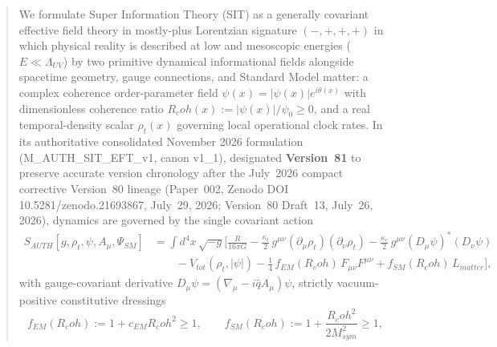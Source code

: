 \documentclass[american,11pt,letterpaper]{article}
\newcommand{\Rcoh}{R_{\mathrm{coh}}}
\def\mathcal#1{#1}%
\def\mathrm#1{#1}%
\def\texttt#1{#1}%
\def\emph#1{#1}%
\def\Rcoh{R_coh}%
\begin{document}
\begin{abstract}
We formulate \emph{Super Information Theory} (SIT) as a generally covariant effective field theory in mostly-plus Lorentzian signature $(-,+,+,+)$ in which physical reality is described at low and mesoscopic energies ($E \ll \Lambda_{\mathrm{UV}}$) by two primitive dynamical informational fields alongside spacetime geometry, gauge connections, and Standard Model matter: a complex coherence order-parameter field $\psi(x) = |\psi(x)| e^{i\theta(x)}$ with dimensionless coherence ratio $\Rcoh(x) := |\psi(x)|/\psi_0 \ge 0$, and a real temporal-density scalar $\rho_t(x)$ governing local operational clock rates. In its authoritative consolidated November 2026 formulation (\texttt{M\_AUTH\_SIT\_EFT\_v1}, canon \texttt{v1\_1}), designated \textbf{Version~81} to preserve accurate version chronology after the July~2026 compact corrective \emph{Version~80} lineage (Paper~002, Zenodo DOI \texttt{10.5281/zenodo.21693867}, July~29, 2026; Version~80 Draft~13, July~26, 2026), dynamics are governed by the single covariant action
\begin{align}
S_{\mathrm{AUTH}}[g,\rho_t,\psi,A_\mu,\Psi_{\mathrm{SM}}]
&= \int d^4x\,\sqrt{-g}\Biggl[
  \frac{R}{16\pi G}
  - \frac{\kappa_t}{2}\,g^{\mu\nu}(\partial_\mu\rho_t)(\partial_\nu\rho_t)
  - \frac{\kappa_c}{2}\,g^{\mu\nu}(D_\mu\psi)^*(D_\nu\psi)
  \nonumber\\
&\qquad
  - V_{\mathrm{tot}}(\rho_t,|\psi|)
  - \frac{1}{4}\,f_{\mathrm{EM}}(\Rcoh)\,F_{\mu\nu}F^{\mu\nu}
  + f_{\mathrm{SM}}(\Rcoh)\,\mathcal{L}_{\mathrm{matter}}
\Biggr],
\label{eq:abstract_master_action}
\end{align}
with gauge-covariant derivative $D_\mu\psi = (\nabla_\mu - i\hat{q}A_\mu)\psi$, strictly vacuum-positive constitutive dressings
\[
f_{\mathrm{EM}}(\Rcoh) := 1 + c_{\mathrm{EM}}\Rcoh^2 \ge 1,
\qquad
f_{\mathrm{SM}}(\Rcoh) := 1 + \frac{\Rcoh^2}{2 M_{\mathrm{sym}}^2} \ge 1,
\]

\end{abstract}
\end{document}
